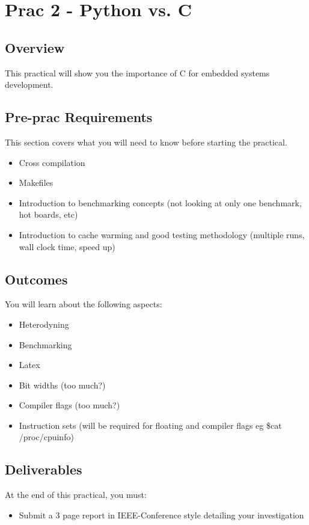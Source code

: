 \newpage
\section{Prac 2 - Python vs. C}
\label{sec:Prac2}

\subsection{Overview}
This practical will show you the importance of C for embedded systems development. 

\subsection{Pre-prac Requirements}
This section covers what you will need to know before starting the practical.
\begin{itemize}
    \item Cross compilation
    \item Makefiles
    \item Introduction to benchmarking concepts (not looking at only one benchmark, hot boards, etc)
    \item Introduction to cache warming and good testing methodology (multiple runs, wall clock time, speed up)
\end{itemize}

\subsection{Outcomes}
You will learn about the following aspects:
\begin{itemize}
    \item Heterodyning
    \item Benchmarking
    \item Latex
    \item Bit widths (too much?)
    \item Compiler flags (too much?)
    \item Instruction sets (will be required for floating and compiler flags eg \$cat /proc/cpuinfo)
\end{itemize}

\subsection{Deliverables}
At the end of this practical, you must:
\begin{itemize}
    \item Submit a 3 page report in IEEE-Conference style detailing your investigation
\end{itemize}


